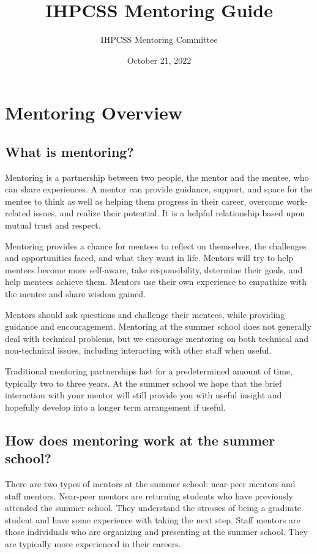 \documentclass[titlepage]{article}
\author{IHPCSS Mentoring Committee}
\date{October 21, 2022}
\title{IHPCSS Mentoring Guide}
\let\oldsection\section
\renewcommand{\section}{\clearpage\oldsection}
\begin{document}
\maketitle
\tableofcontents


\section{Mentoring Overview}
\label{sec:org832eaa8}
\subsection{What is mentoring?}
\label{sec:orga2250ea}

Mentoring is a partnership between two people, the mentor and the mentee, who can share experiences. A mentor can provide guidance, support, and space for the mentee to think as well as helping them progress in their career, overcome work-related issues, and realize their potential. It is a helpful relationship based upon mutual trust and respect.

Mentoring provides a chance for mentees to reflect on themselves, the challenges and opportunities faced, and what they want in life. Mentors will try to help mentees become more self-aware, take responsibility, determine their goals, and help mentees achieve them.  Mentors use their own experience to empathize with the mentee and share wisdom gained.

Mentors should ask questions and challenge their mentees, while providing guidance and encouragement. Mentoring at the summer school does not generally deal with technical problems, but we encourage mentoring on both technical and non-technical issues, including interacting with other staff when useful.

Traditional mentoring partnerships last for a predetermined amount of time, typically two to three years. At the summer school we hope that the brief interaction with your mentor will still provide you with useful insight and hopefully develop into a longer term arrangement if useful.

\subsection{How does mentoring work at the summer school?}
\label{sec:org81f01c5}

There are two types of mentors at the summer school: near-peer mentors and staff mentors. Near-peer mentors are returning students who have previously attended the summer school. They understand the stresses of being a graduate student and have some experience with taking the next step. Staff mentors are those individuals who are organizing and presenting at the summer school. They are typically more experienced in their careers.
\end{document}
